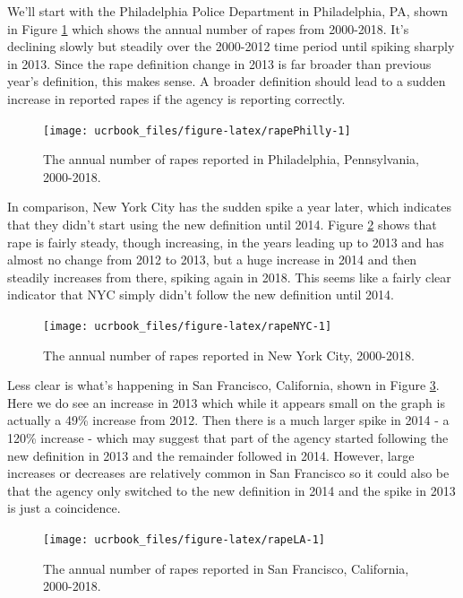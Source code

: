 \documentclass[
  12pt,
  openany]{book}
\begin{document}
We'll start with the Philadelphia Police Department in Philadelphia, PA, shown in Figure \ref{fig:rapePhilly} which shows the annual number of rapes from 2000-2018. It's declining slowly but steadily over the 2000-2012 time period until spiking sharply in 2013. Since the rape definition change in 2013 is far broader than previous year's definition, this makes sense. A broader definition should lead to a sudden increase in reported rapes if the agency is reporting correctly.

\begin{figure}

{\centering \texttt{[image: ucrbook\_files/figure-latex/rapePhilly-1]} 

}

\caption{The annual number of rapes reported in Philadelphia, Pennsylvania, 2000-2018.}\label{fig:rapePhilly}
\end{figure}

In comparison, New York City has the sudden spike a year later, which indicates that they didn't start using the new definition until 2014. Figure \ref{fig:rapeNYC} shows that rape is fairly steady, though increasing, in the years leading up to 2013 and has almost no change from 2012 to 2013, but a huge increase in 2014 and then steadily increases from there, spiking again in 2018. This seems like a fairly clear indicator that NYC simply didn't follow the new definition until 2014.

\begin{figure}

{\centering \texttt{[image: ucrbook\_files/figure-latex/rapeNYC-1]} 

}

\caption{The annual number of rapes reported in New York City, 2000-2018.}\label{fig:rapeNYC}
\end{figure}

Less clear is what's happening in San Francisco, California, shown in Figure \ref{fig:rapeLA}.
Here we do see an increase in 2013 which while it appears small on the graph is actually a 49\% increase from 2012. Then there is a much larger spike in 2014 - a 120\% increase - which may suggest that part of the agency started following the new definition in 2013 and the remainder followed in 2014. However, large increases or decreases are relatively common in San Francisco so it could also be that the agency only switched to the new definition in 2014 and the spike in 2013 is just a coincidence.

\begin{figure}

{\centering \texttt{[image: ucrbook\_files/figure-latex/rapeLA-1]} 

}

\caption{The annual number of rapes reported in San Francisco, California, 2000-2018.}\label{fig:rapeLA}
\end{figure}
\end{document}
